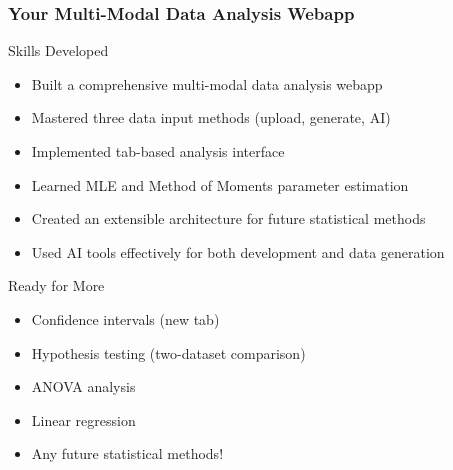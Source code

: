 \documentclass[aspectratio=169]{beamer}
\begin{document}
\begin{frame}
\frametitle{Your Multi-Modal Data Analysis Webapp}
\begin{alertblock}{Skills Developed}
\begin{itemize}
\footnotesize
\item Built a comprehensive multi-modal data analysis webapp
\item Mastered three data input methods (upload, generate, AI)
\item Implemented tab-based analysis interface
\item Learned MLE and Method of Moments parameter estimation
\item Created an extensible architecture for future statistical methods
\item Used AI tools effectively for both development and data generation
\end{itemize}
\end{alertblock}

\begin{exampleblock}{Ready for More}
\begin{itemize}
\footnotesize
\item Confidence intervals (new tab)
\item Hypothesis testing (two-dataset comparison)
\item ANOVA analysis
\item Linear regression
\item Any future statistical methods!
\end{itemize}
\end{exampleblock}
\end{frame}
\end{document}
